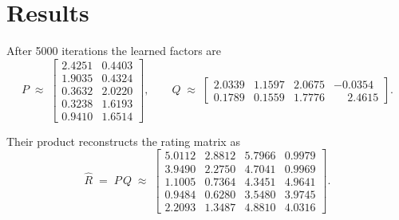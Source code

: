 \documentclass[12pt]{article}
\begin{document}
	\newpage
	\section{Results}\label{sec:results}

	After 5000 iterations the learned factors are
	\begin{equation}
		P \;\approx\;
		\begin{bmatrix}
			2.4251 & 0.4403 \\
			1.9035 & 0.4324 \\
			0.3632 & 2.0220 \\
			0.3238 & 1.6193 \\
			0.9410 & 1.6514
		\end{bmatrix},
		\qquad
		Q \;\approx\;
		\begin{bmatrix}
			2.0339 & 1.1597 & 2.0675 & -0.0354 \\
			0.1789 & 0.1559 & 1.7776 & \phantom{-}2.4615
		\end{bmatrix}.
	\end{equation}

	Their product reconstructs the rating matrix as
	\begin{equation}
		\hat{R} \;=\; P\,Q \;\approx\;
		\begin{bmatrix}
			5.0112 & 2.8812 & 5.7966 & 0.9979 \\
			3.9490 & 2.2750 & 4.7041 & 0.9969 \\
			1.1005 & 0.7364 & 4.3451 & 4.9641 \\
			0.9484 & 0.6280 & 3.5480 & 3.9745 \\
			2.2093 & 1.3487 & 4.8810 & 4.0316
		\end{bmatrix}.
	\end{equation}
\end{document}
